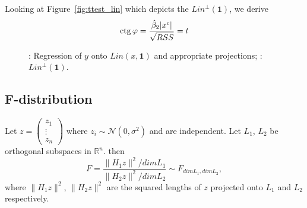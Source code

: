 Looking at Figure~\ref{fig:ttest_lin} which depicts the $Lin^{\perp}(\mathbf{1})$,
we derive
\[
\operatorname{ctg} \varphi = \frac{\hat \beta_2 \vert x^c \vert}{\sqrt{RSS}} = t
\]

\begin{figure}[ht!]
\begin{center}
\caption{: Regression of $y$ onto $Lin(x, \mathbf{1})$ and appropriate projections;
: $Lin^{\perp}(\mathbf{1})$.}
\end{center}
\end{figure}


\subsection{F-distribution}


\begin{definition}\label{def:f}
Let $z = \begin{pmatrix} z_1 \\ \vdots \\ z_n \end{pmatrix}$
where $z_i \sim \mathcal{N}(0, \sigma^2)$ and are independent.
Let $L_1$, $L_2$ be orthogonal subspaces in $\mathbb{R}^n$.
then
\[
F = \frac{\lVert H_1 z \rVert^2 / dim L_1}{\lVert H_2 z \rVert^2 / dim L_2} \sim F_{dim L_1, dim L_2},
\]
where $\lVert H_1 z \rVert^2$, $\lVert H_2 z \rVert^2$ are the squared lengths
of $z$ projected onto $L_1$ and $L_2$ respectively.
\end{definition}

